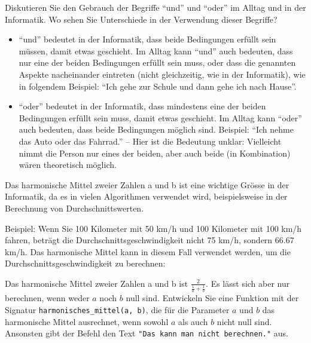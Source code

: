 \begin{mychallenge}
	Diskutieren Sie den Gebrauch der Begriffe \enquote{und} und \enquote{oder} im Alltag und in der Informatik. Wo sehen Sie Unterschiede in der Verwendung dieser Begriffe?
	\begin{myanswer}
		\begin{itemize}
			\item \enquote{und} bedeutet in der Informatik, dass beide Bedingungen erfüllt sein müssen, damit etwas geschieht. Im Alltag kann \enquote{und} auch bedeuten, dass nur eine der beiden Bedingungen erfüllt sein muss, oder dass die genannten Aspekte nacheinander eintreten (nicht gleichzeitig, wie in der Informatik), wie in folgendem Beispiel: \enquote{Ich gehe zur Schule und dann gehe ich nach Hause}.
			\item \enquote{oder} bedeutet in der Informatik, dass mindestens eine der beiden Bedingungen erfüllt sein muss, damit etwas geschieht. Im Alltag kann \enquote{oder} auch bedeuten, dass beide Bedingungen möglich sind. Beispiel: \enquote{Ich nehme das Auto oder das Fahrrad.} -- Hier ist die Bedeutung unklar: Vielleicht nimmt die Person nur eines der beiden, aber auch beide (in Kombination) wären theoretisch möglich.
		\end{itemize}
	\end{myanswer}
\end{mychallenge}

\begin{mychallenge}
	Das harmonische Mittel zweier Zahlen a und b ist eine wichtige Grösse in der Informatik, da es in vielen Algorithmen verwendet wird, beispielsweise in der Berechnung von Durchschnittswerten.

	Beispiel: Wenn Sie 100 Kilometer mit 50 km/h und 100 Kilometer mit 100 km/h fahren, beträgt die Durchschnittsgeschwindigkeit nicht 75 km/h, sondern 66.67 km/h. Das harmonische Mittel kann in diesem Fall verwendet werden, um die Durchschnittsgeschwindigkeit zu berechnen:

	Das harmonische Mittel zweier Zahlen a und b ist $\frac{2}{\frac{1}{a}+\frac{1}{b}}$. Es lässt sich aber nur berechnen, wenn weder $a$ noch $b$ null sind. Entwickeln Sie eine Funktion mit der Signatur \lstinline|harmonisches_mittel(a, b)|, die für die Parameter $a$ und $b$ das harmonische Mittel ausrechnet, wenn sowohl $a$ als auch $b$ nicht null sind. Ansonsten gibt der Befehl den Text \lstinline|"Das kann man nicht berechnen."| aus.

	\begin{myanswer}
		
	\end{myanswer}
\end{mychallenge}

